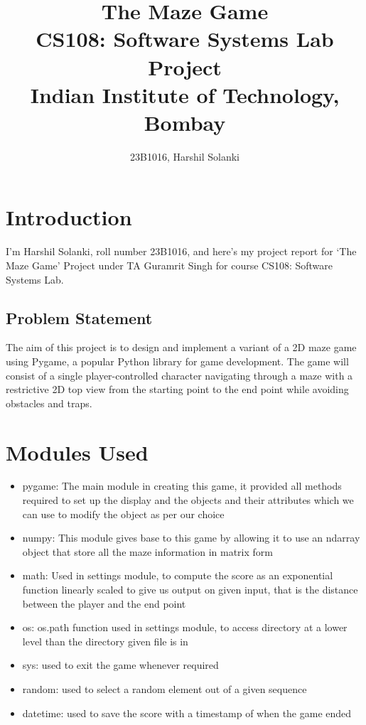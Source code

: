 \documentclass{article}
\begin{document}
\title{
{\Huge\textbf{The Maze Game}}\\[2cm]
    CS108: Software Systems Lab Project\\[0.5cm]
    Indian Institute of Technology, Bombay
}
\author{23B1016, Harshil Solanki}
\date{}
\maketitle
\tableofcontents
\clearpage

\section{Introduction}
I'm Harshil Solanki, roll number 23B1016, and here's my project report for `The Maze Game' Project under TA Guramrit Singh for course CS108: Software Systems Lab.

\subsection{Problem Statement}
The aim of this project is to design and implement a variant of a 2D maze game using Pygame, a
popular Python library for game development. The game will consist of a single player-controlled character
navigating through a maze with a restrictive 2D top view from the starting point to the end point while
avoiding obstacles and traps.

\section{Modules Used}
\begin{itemize}
    \item pygame: The main module in creating this game, it provided all methods required to set up the display and the objects and their attributes which we can use to modify the object as per our choice
    \item numpy: This module gives base to this game by allowing it to use an ndarray object that store all the maze information in matrix form
    \item math: Used in settings module, to compute the score as an exponential function linearly scaled to give us output on given input, that is the distance between the player and the end point
    \item os: os.path function used in settings module, to access directory at a lower level than the directory given file is in
    \item sys: used to exit the game whenever required
    \item random: used to select a random element out of a given sequence 
    \item datetime: used to save the score with a timestamp of when the game ended 
\end{itemize}
\end{document}
